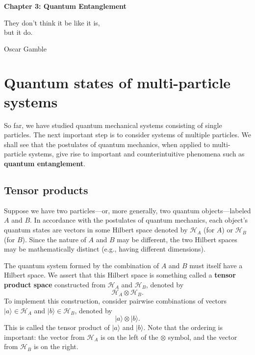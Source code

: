\documentclass[pra,12pt]{revtex4}
\begin{document}
\setcounter{page}{38}

\begin{center}
{\Large \textbf{Chapter 3: Quantum Entanglement}}
\end{center}

\epigraph{They don't think it be like it is, \\but it do.}{Oscar Gamble}

\section{Quantum states of multi-particle systems}

So far, we have studied quantum mechanical systems consisting of
single particles.  The next important step is to consider systems of
multiple particles.  We shall see that the postulates of quantum
mechanics, when applied to multi-particle systems, give rise to
important and counterintuitive phenomena such as \textbf{quantum
  entanglement}.

\subsection{Tensor products}
\label{sec:tensorprod}

Suppose we have two particles---or, more generally, two quantum
objects---labeled $A$ and $B$.  In accordance with the postulates of
quantum mechanics, each object's quantum states are vectors in some
Hilbert space denoted by $\mathscr{H}_A$ (for $A$) or $\mathscr{H}_B$
(for $B$). Since the nature of $A$ and $B$ may be different, the two
Hilbert spaces may be mathematically distinct (e.g., having different
dimensions).

The quantum system formed by the combination of $A$ and $B$ must
itself have a Hilbert space.  We assert that this Hilbert space is
something called a \textbf{tensor product space} constructed from
$\mathscr{H}_A$ and $\mathscr{H}_B$, denoted by
\begin{equation*}
  \mathscr{H}_A\otimes \mathscr{H}_B.
\end{equation*}
To implement this construction, consider pairwise combinations of
vectors $|a\rangle \in \mathscr{H}_A$ and $|b\rangle \in
\mathscr{H}_B$, denoted by
\begin{equation*}
  |a\rangle \otimes |b\rangle.
\end{equation*}
This is called the tensor product of $|a\rangle$ and $|b\rangle$.
Note that the ordering is important: the vector from $\mathscr{H}_A$
is on the left of the $\otimes$ symbol, and the vector from
$\mathscr{H}_B$ is on the right.
\end{document}
